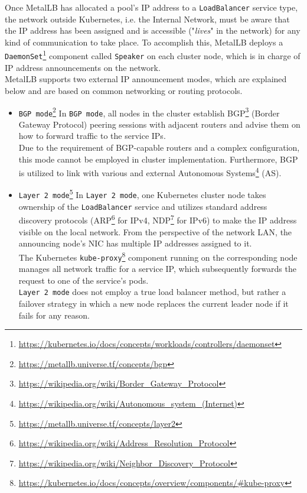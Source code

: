 Once MetalLB has allocated a pool's IP address to a \texttt{LoadBalancer} service
type, the network outside Kubernetes, i.e. the Internal Network, must be aware that
the IP address has been assigned and is accessible ("\textit{lives}" in the network)
for any kind of communication to take place. To accomplish this, MetalLB deploys
a \texttt{DaemonSet}\footnote{\url{https://kubernetes.io/docs/concepts/workloads/controllers/daemonset}}
component called \texttt{Speaker} on each cluster node, which is in charge of IP
address announcements on the network\cite{metallb_installation}. \\ %
MetalLB supports two external IP announcement modes, which are explained below and
are based on common networking or routing protocols\cite{metallb_external_announcement}.
\begin{itemize}
  \item \texttt{BGP mode}\footnote{\url{https://metallb.universe.tf/concepts/bgp}}
    \newline
    In \texttt{BGP mode}, all nodes in the cluster establish BGP\footnote{\url{https://wikipedia.org/wiki/Border_Gateway_Protocol}}
    (Border Gateway Protocol) peering sessions with adjacent routers and advise
    them on how to forward traffic to the service IPs\cite{metallb_bgp}. \\ %
    Due to the requirement of BGP-capable routers and a complex configuration,
    this mode cannot be employed in cluster implementation. Furthermore, BGP is
    utilized to link with various and external Autonomous Systems\footnote{\url{https://wikipedia.org/wiki/Autonomous_system_(Internet)}}
    (AS).

  \item \texttt{Layer 2 mode}\footnote{\url{https://metallb.universe.tf/concepts/layer2}}
    \newline
    In \texttt{Layer 2 mode}, one Kubernetes cluster node takes ownership of the
    \texttt{LoadBalancer} service and utilizes standard address discovery protocols
    (ARP\footnote{\url{https://wikipedia.org/wiki/Address_Resolution_Protocol}}
    for IPv4, NDP\footnote{\url{https://wikipedia.org/wiki/Neighbor_Discovery_Protocol}}
    for IPv6) to make the IP address visible on the local network. From the perspective
    of the network LAN, the announcing node's NIC has multiple IP addresses
    assigned to it. \\ %
    The Kubernetes \texttt{kube-proxy}\footnote{\url{https://kubernetes.io/docs/concepts/overview/components/\#kube-proxy}}
    component running on the corresponding node manages all network traffic for a
    service IP, which subsequently forwards the request to one of the service's
    pods. \\ %
    \texttt{Layer 2 mode} does not employ a true load balancer method, but
    rather a failover strategy in which a new node replaces the current leader
    node if it fails for any reason.\cite{metallb_layer2}
\end{itemize}
